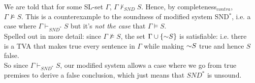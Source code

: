 \documentclass[12pt]{memoir}
\begin{document}
\begin{enumerate}[1.)]
We are told that for some SL-set $\Gamma$, $\Gamma \nvdash_{\mathit{SND}} S$. Hence, by completeness$_{contra}$, $\Gamma \nvDash S$. This is a counterexample to the soundness of modified system SND$^*$, i.e. a case where $\Gamma \vdash_{\mathit{SND}^*} S$ but it's \textit{not the case} that $\Gamma \vDash S$. \\

Spelled out in more detail: since $\Gamma \nvDash S$, the set $\Gamma \cup \{ \enot S \}$ is satisfiable: i.e. there is a TVA that makes true every sentence in $\Gamma$ while making $\enot S$ true and hence $S$ false. \\ So since $\Gamma \vdash_{\mathit{SND}^*} S$, our modified system allows a case where we go from true premises to derive a false conclusion, which just means that $\mathit{SND}^*$ is unsound. 



\iffalse

\item  %
\begin{equation*}
\begin{nd}
	\hypo{1}{Gb \eif Fb} \pr{}
	\hypo{2}{Gb} \pr{}
	\have{3}{Fb} \ce{1, 2}
	\have{4}{Fb \eor Hb} \oi{3}
	\have{5}{\qt{\exists}{x}(Fx \eor Hx)} \Ei{4}
\end{nd}
\end{equation*}

\fi 











\end{enumerate}
\end{document}

